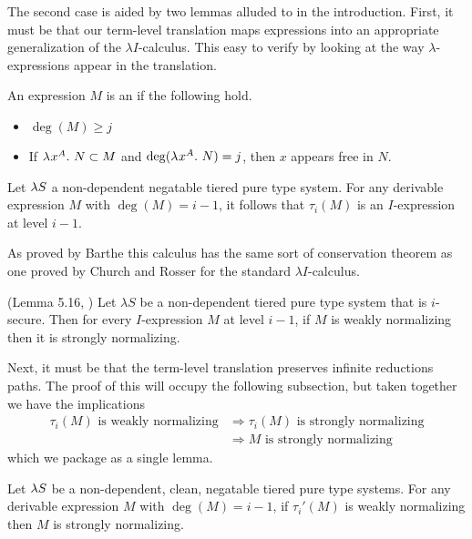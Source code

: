 \documentclass{article}
\begin{document}
The second case is aided by two lemmas alluded to in the introduction.
First, it must be that our term-level translation maps expressions into an appropriate generalization of the $\lambda I$-calculus.
This easy to verify by looking at the way $\lambda$-expressions appear in the translation.

\begin{definition}
\label{def:lambda-i}
An expression $M$ is an  if the following hold.
\begin{itemize}
    \item $\deg(M) \geq j$
    \item If $\lambda^{} x^{A}. \ N \subset M$ and $\deg(\lambda^{} x^{A}. \ N) = j$, then $x$ appears free in $N$.
\end{itemize}
\end{definition}

\begin{lemma}\label{lem:tau-i}
Let $\lambda S$ a non-dependent negatable tiered pure type system.
For any derivable expression $M$ with $\deg(M) = i - 1$, it follows that $\tau_i(M)$ is an $I$-expression at level $i - 1$.
\end{lemma}

As proved by Barthe \etal this calculus has the same sort of conservation theorem as one proved by Church and Rosser \cite{church-rosser-1936} for the standard $\lambda I$-calculus.

\begin{lemma} (Lemma 5.16, \cite{barthe-et-al-2001}) Let $\lambda S$ be a non-dependent tiered pure type system that is $i$-secure. Then for every $I$-expression $M$ at level $i - 1$, if $M$ is weakly normalizing then it is strongly normalizing.
\end{lemma}

Next, it must be that the term-level translation preserves infinite reductions paths.
The proof of this will occupy the following subsection, but taken together we have the implications
\begin{align*}
\tau_i(M) \text{ is weakly normalizing} &\Rightarrow
\tau_i(M) \text{ is strongly normalizing} \\ &\Rightarrow
M \text{ is strongly normalizing}
\end{align*}
which we package as a single lemma.

\begin{lemma}\label{lem:wn-to-sn}
Let $\lambda S$ be a non-dependent, clean, negatable tiered pure type systems.
For any derivable expression $M$ with $\deg(M) = i - 1$, if $\tau_i'(M)$ is weakly normalizing then $M$ is strongly normalizing.
\end{lemma}
\end{document}
